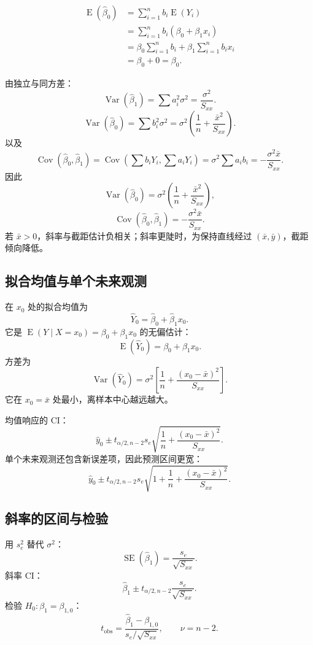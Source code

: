 \documentclass[11pt,a4paper]{article}
\newcommand{\E}{\operatorname{E}}
\newcommand{\Var}{\operatorname{Var}}
\newcommand{\Cov}{\operatorname{Cov}}
\newcommand{\SE}{\operatorname{SE}}
\newcommand{\1}{\mathbf{1}}
\begin{document}
\begin{proofbox}
\begin{align*}
  \E(\hat\beta_0)
  &=
  \sum_{i=1}^nb_i\E(Y_i)\\
  &=
  \sum_{i=1}^nb_i(\beta_0+\beta_1x_i)\\
  &=
  \beta_0\sum_{i=1}^nb_i
  +
  \beta_1\sum_{i=1}^nb_ix_i\\
  &=\beta_0+0=\beta_0.
\end{align*}
\end{proofbox}

由独立与同方差：
\[
  \Var(\hat\beta_1)
  =
  \sum a_i^2\sigma^2
  =
  \boxed{\frac{\sigma^2}{S_{xx}}}.
\]
\[
  \Var(\hat\beta_0)
  =
  \sum b_i^2\sigma^2
  =
  \sigma^2\left(\frac1n+\frac{\bar x^2}{S_{xx}}\right).
\]
以及
\[
  \Cov(\hat\beta_0,\hat\beta_1)
  =
  \Cov\left(\sum b_iY_i,\sum a_iY_i\right)
  =
  \sigma^2\sum a_ib_i
  =
  -\frac{\sigma^2\bar x}{S_{xx}}.
\]
因此
\[
  \boxed{
  \Var(\hat\beta_0)
  =
  \sigma^2\left(\frac1n+\frac{\bar x^2}{S_{xx}}\right),
  }
\]
\[
  \boxed{
  \Cov(\hat\beta_0,\hat\beta_1)
  =
  -\frac{\sigma^2\bar x}{S_{xx}}.
  }
\]
若 $\bar x>0$，斜率与截距估计负相关；斜率更陡时，为保持直线经过 $(\bar x,\bar y)$，截距倾向降低。

\subsection{拟合均值与单个未来观测}

在 $x_0$ 处的拟合均值为
\[
  \hat Y_0=\hat\beta_0+\hat\beta_1x_0.
\]
它是 $\E(Y\mid X=x_0)=\beta_0+\beta_1x_0$ 的无偏估计：
\[
  \E(\hat Y_0)=\beta_0+\beta_1x_0.
\]
方差为
\[
  \boxed{
  \Var(\hat Y_0)
  =
  \sigma^2
  \left[
  \frac1n+\frac{(x_0-\bar x)^2}{S_{xx}}
  \right].
  }
\]
它在 $x_0=\bar x$ 处最小，离样本中心越远越大。

均值响应的 CI：
\[
  \boxed{
  \hat y_0
  \pm
  t_{\alpha/2,n-2}s_e
  \sqrt{\frac1n+\frac{(x_0-\bar x)^2}{S_{xx}}}.
  }
\]
单个未来观测还包含新误差项，因此预测区间更宽：
\[
  \boxed{
  \hat y_0
  \pm
  t_{\alpha/2,n-2}s_e
  \sqrt{1+\frac1n+\frac{(x_0-\bar x)^2}{S_{xx}}}.
  }
\]

\subsection{斜率的区间与检验}

用 $s_e^2$ 替代 $\sigma^2$：
\[
  \SE(\hat\beta_1)=\frac{s_e}{\sqrt{S_{xx}}}.
\]
斜率 CI：
\[
  \boxed{
  \hat\beta_1
  \pm
  t_{\alpha/2,n-2}\frac{s_e}{\sqrt{S_{xx}}}.
  }
\]
检验 $H_0:\beta_1=\beta_{1,0}$：
\[
  \boxed{
  t_{\mathrm{obs}}
  =
  \frac{\hat\beta_1-\beta_{1,0}}
  {s_e/\sqrt{S_{xx}}},
  \qquad \nu=n-2.
  }
\]
\end{document}
